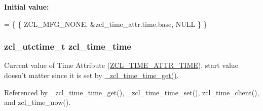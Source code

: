 {\bfseries Initial value\-:}
\begin{DoxyCode}
=
      \{ \{ ZCL\_MFG\_NONE, &zcl\_time\_attr.time.base, NULL \} \}
\end{DoxyCode}
\hypertarget{group__zcl__time_ga4e1da84a7e72ee1626d6328252fd621a}{
\subsubsection[{zcl\-\_\-time\-\_\-time}]{\setlength{\rightskip}{0pt plus 5cm}zcl\-\_\-utctime\-\_\-t zcl\-\_\-time\-\_\-time}}\label{group__zcl__time_ga4e1da84a7e72ee1626d6328252fd621a}


Current value of Time Attribute (\hyperlink{group__zcl__time_ga6abf0e2cc70ac533ebe153a40185be63}{Z\-C\-L\-\_\-\-T\-I\-M\-E\-\_\-\-A\-T\-T\-R\-\_\-\-T\-I\-M\-E}), start value doesn't matter since it is set by \hyperlink{group__zcl__time_ga9c0749b71318a4f7fd28d9112ffd5462}{\-\_\-zcl\-\_\-time\-\_\-time\-\_\-get()}. 



Referenced by \-\_\-zcl\-\_\-time\-\_\-time\-\_\-get(), \-\_\-zcl\-\_\-time\-\_\-time\-\_\-set(), zcl\-\_\-time\-\_\-client(), and zcl\-\_\-time\-\_\-now().

